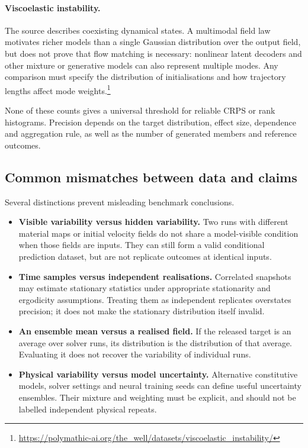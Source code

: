 \paragraph{Viscoelastic instability.}
The source describes coexisting dynamical states. A multimodal field law
motivates richer models than a single Gaussian distribution over the output
field, but does not prove that flow matching is necessary: nonlinear latent
decoders and other mixture or generative models can also represent multiple
modes. Any comparison must specify the distribution of initialisations and how
trajectory lengths affect mode
weights.\footnote{\url{https://polymathic-ai.org/the_well/datasets/viscoelastic_instability/}}

None of these counts gives a universal threshold for reliable CRPS or rank
histograms. Precision depends on the target distribution, effect size,
dependence and aggregation rule, as well as the number of generated members
and reference outcomes.

\subsection{Common mismatches between data and claims}
\label{sec:bench:reject}

Several distinctions prevent misleading benchmark conclusions.

\begin{itemize}
  \item \textbf{Visible variability versus hidden variability.}
    Two runs with different material maps or initial velocity fields do not
    share a model-visible condition when those fields are inputs. They can
    still form a valid conditional prediction dataset, but are not replicate
    outcomes at identical inputs.
  \item \textbf{Time samples versus independent realisations.}
    Correlated snapshots may estimate stationary statistics under appropriate
    stationarity and ergodicity assumptions. Treating them as independent
    replicates overstates precision; it does not make the stationary
    distribution itself invalid.
  \item \textbf{An ensemble mean versus a realised field.}
    If the released target is an average over solver runs, its distribution is
    the distribution of that average. Evaluating it does not recover the
    variability of individual runs.
  \item \textbf{Physical variability versus model uncertainty.}
    Alternative constitutive models, solver settings and neural training seeds
    can define useful uncertainty ensembles. Their mixture and weighting must
    be explicit, and should not be labelled independent physical repeats.
\end{itemize}


